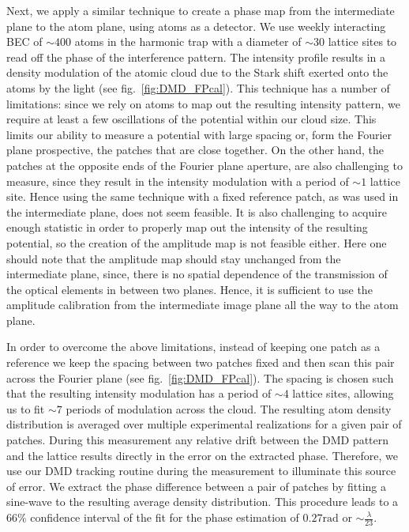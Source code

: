 Next, we apply a similar technique to create a phase map from the intermediate plane to the atom plane, using atoms as a detector. We use weekly interacting BEC of $\sim 400$ atoms in the harmonic trap with a diameter of $\sim 30$ lattice sites to read off the phase of the interference pattern. The intensity profile results in a density modulation of the atomic cloud due to the Stark shift exerted onto the atoms by the light (see fig.~\ref{fig:DMD_FPcal}). This technique has a number of limitations: since we rely on atoms to map out the resulting intensity pattern, we require at least a few oscillations of the potential within our cloud size. This limits our ability to measure a potential with large spacing or, form the Fourier plane prospective, the patches that are close together. On the other hand, the patches at the opposite ends of the Fourier plane aperture, are also challenging to measure, since they result in the intensity modulation with a period of $\sim 1$ lattice site. Hence using the same technique with a fixed reference patch, as was used in the intermediate plane, does not seem feasible. It is also challenging to acquire enough statistic in order to properly map out the intensity of the resulting potential, so the creation of the amplitude map is not feasible either. Here one should note that the amplitude map should stay unchanged from the intermediate plane, since, there is no spatial dependence of the transmission of the optical elements in between two planes. Hence, it is sufficient to use the amplitude calibration from the intermediate image plane all the way to the atom plane.

In order to overcome the above limitations, instead of keeping one patch as a reference we keep the spacing between two patches fixed and then scan this pair across the Fourier plane (see fig.~\ref{fig:DMD_FPcal}). The spacing is chosen such that the resulting intensity modulation has a period of $\sim 4$ lattice sites, allowing us to fit $\sim 7$ periods of modulation across the cloud. The resulting atom density distribution is averaged over multiple experimental realizations for a given pair of patches. During this measurement any relative drift between the DMD pattern and the lattice results directly in the error on the extracted phase. Therefore, we use our DMD tracking routine during the measurement to illuminate this source of error. We extract the phase difference between a pair of patches by fitting a sine-wave to the resulting average density distribution. This procedure leads to a $66\%$ confidence interval of the fit for the phase estimation of $0.27 \mathrm{rad}$ or $\sim \frac{\lambda}{23}$.

